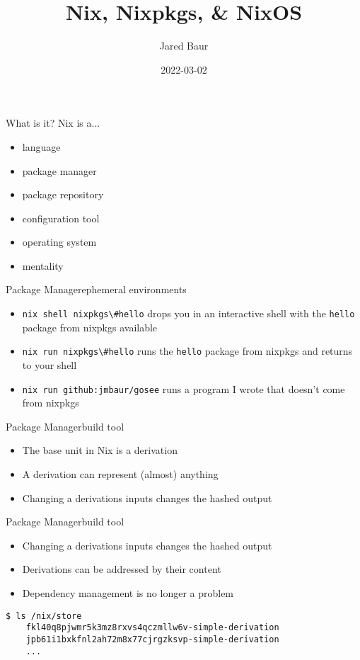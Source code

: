 \documentclass{beamer}
\title{Nix, Nixpkgs, \& NixOS}
\author{Jared Baur}
\date{2022-03-02}
\begin{document}
\lstset{language=Nix,basicstyle=\small}

\begin{frame}
	\titlepage
\end{frame}

\begin{frame}{What is it?}
	Nix is a...
	\begin{itemize}
		\item language
		\item package manager
		\item package repository
		\item configuration tool
		\item operating system
		\item mentality
	\end{itemize}
\end{frame}

\begin{frame}{Package Manager}{ephemeral environments}
	\begin{itemize}
		\item \lstinline[language={}]!nix shell nixpkgs\#hello! drops you in an
		      interactive shell with the \lstinline!hello! package from nixpkgs
		      available
		\item \lstinline[language={}]!nix run nixpkgs\#hello! runs the
		      \lstinline!hello! package from nixpkgs and returns to your shell
		\item \lstinline[language={}]!nix run github:jmbaur/gosee! runs a
		      program I wrote that doesn't come from nixpkgs
	\end{itemize}
\end{frame}

\begin{frame}{Package Manager}{build tool}
	\begin{itemize}
		\item The base unit in Nix is a derivation
		\item A derivation can represent (almost) anything
		\item Changing a derivations inputs changes the hashed output
	\end{itemize}
	
\end{frame}

\begin{frame}[containsverbatim]{Package Manager}{build tool}
	\begin{itemize}
		\item Changing a derivations inputs changes the hashed output
		\item Derivations can be addressed by their content
		\item Dependency management is no longer a problem
	\end{itemize}
	\begin{lstlisting}[language={}]
	$ ls /nix/store
	fkl40q8pjwmr5k3mz8rxvs4qczmllw6v-simple-derivation
	jpb61i1bxkfnl2ah72m8x77cjrgzksvp-simple-derivation
	...
	\end{lstlisting}
\end{frame}
\end{document}
